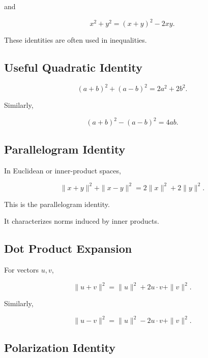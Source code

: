 and

\[
\boxed{
x^2+y^2
=
(x+y)^2-2xy.
}
\]

These identities are often used in inequalities.

\subsection{Useful Quadratic Identity}
\label{subsec:useful-quadratic-identity}

\[
\boxed{
(a+b)^2+(a-b)^2
=
2a^2+2b^2.
}
\]

Similarly,

\[
\boxed{
(a+b)^2-(a-b)^2
=
4ab.
}
\]

\subsection{Parallelogram Identity}
\label{subsec:parallelogram-identity-reference}

In Euclidean or inner-product spaces,

\[
\boxed{
\|x+y\|^2
+
\|x-y\|^2
=
2\|x\|^2
+
2\|y\|^2.
}
\]

This is the parallelogram identity.

It characterizes norms induced by inner products.

\subsection{Dot Product Expansion}
\label{subsec:dot-product-expansion}

For vectors \(u,v\),

\[
\boxed{
\|u+v\|^2
=
\|u\|^2
+
2u\cdot v
+
\|v\|^2.
}
\]

Similarly,

\[
\boxed{
\|u-v\|^2
=
\|u\|^2
-
2u\cdot v
+
\|v\|^2.
}
\]

\subsection{Polarization Identity}
\label{subsec:polarization-identity-reference}

